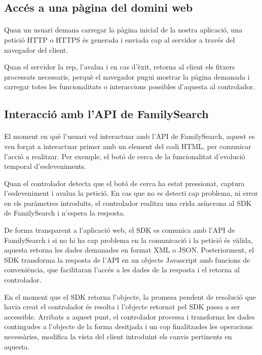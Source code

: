     \subsection{Accés a una pàgina del domini web}

    \paragraph{}
    Quan un usuari demana carregar la pàgina inicial de la nostra aplicació, una petició HTTP o HTTPS és generada i enviada cap al servidor a través del navegador del client.

    Quan el servidor la rep, l'avalua i en cas d'èxit, retorna al client els fitxers processats necessaris, perquè el navegador pugui mostrar la pàgina demanada i carregar totes les funcionalitats o interaccions possibles d'aquesta al controlador.


    \subsection{Interacció amb l'API de FamilySearch}

    \paragraph{}
    El moment en què l'usuari vol interactuar amb l'API de FamilySearch, aquest es veu forçat a interactuar primer amb un element del codi HTML, per comunicar l’acció a realitzar. Per exemple, el botó de cerca de la funcionalitat d'evolució temporal d'esdeveniments.

    Quan el controlador detecta que el botó de cerca ha estat pressionat, captura l'esdeveniment i avalua la petició. En cas que no es detecti cap problema, ni error en els paràmetres introduïts, el controlador realitza una crida asíncrona al SDK de FamilySearch i n'espera la resposta.

    De forma transparent a l'aplicació web, el SDK es comunica amb l’API de Family\-Search i si no hi ha cap problema en la comunicació i la petició és vàlida, aquesta retorna les dades demanades en format XML o JSON. Posteriorment, el SDK transforma la resposta de l’API en un objecte Javascript amb funcions de conveniència, que facilitaran l'accés a les dades de la resposta i el retorna al controlador.

    En el moment que el SDK retorna l'objecte, la promesa pendent de resolució que havia creat el controlador és resolta i l'objecte retornat pel SDK passa a ser accessible. Arribats a aquest punt, el controlador processa i transforma les dades contingudes a l'objecte de la forma desitjada i un cop finalitzades les operacions necessàries, modifica la vista del client introduint els canvis pertinents en aquesta.


